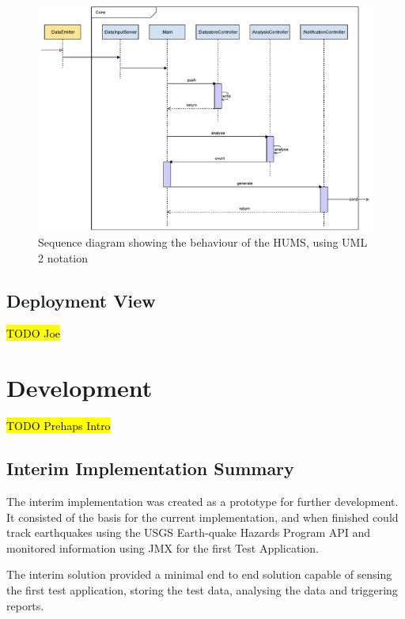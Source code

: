 \documentclass[10pt,a4paper]{article}
\begin{document}
\begin{figure}[tbp]
  \centering
  \includegraphics[width=\textwidth]{images/behaviourView.pdf}
  \caption{Sequence diagram showing the behaviour of the HUMS, using UML 2 notation}
  \label{fig:sequence}
\end{figure}


\subsection{Deployment View}
\hl{TODO Joe}
\section{Development}
\label{sec:dev}
\hl{TODO Prehaps Intro}

\subsection{Interim Implementation Summary}
\label{sec:interim_summary}
The interim implementation was created as a prototype for further development. It consisted of the basis for the current implementation, and when finished could track earthquakes using the USGS Earth-quake Hazards Program API and monitored information using JMX for the first Test Application.

The interim solution provided a minimal end to end solution capable of sensing the first test application, storing the test data, analysing the data and triggering reports. 
\end{document}
